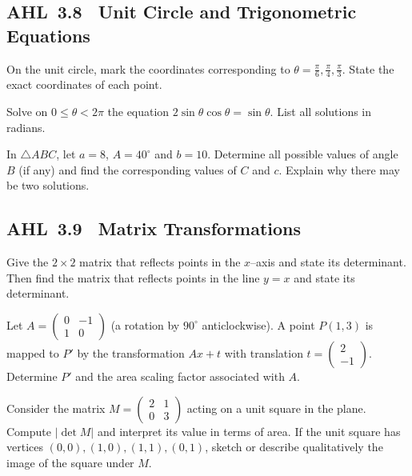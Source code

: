 \documentclass[11pt]{article}
\def\mathbf#1{#1}%
\newcommand{\tocsubsection}[1]{\subsection{#1}}
\newcounter{question}
\begin{document}
\tocsubsection{AHL 3.8 \; Unit Circle and Trigonometric Equations}

\begin{question}
On the unit circle, mark the coordinates corresponding to
\(\theta=\tfrac{\pi}{6},\tfrac{\pi}{4},\tfrac{\pi}{3}\).  State the exact
coordinates of each point.
\end{question}

\begin{question}
Solve on $0\le\theta<2\pi$ the equation $2\sin\theta\cos\theta=\sin\theta$.  List
all solutions in radians.
\end{question}

\begin{question}
In $\triangle ABC$, let $a=8$, $A=40^{\circ}$ and $b=10$.  Determine all
possible values of angle~$B$ (if any) and find the corresponding values of
$C$ and $c$.  Explain why there may be two solutions.
\end{question}

\tocsubsection{AHL 3.9 \; Matrix Transformations}

\begin{question}
Give the $2\times2$ matrix that reflects points in the $x$–axis and state its
determinant.  Then find the matrix that reflects points in the line $y=x$ and
state its determinant.
\end{question}

\begin{question}
Let $A=\begin{pmatrix}0 & -1 \\ 1 & 0\end{pmatrix}$ (a rotation by
$90^{\circ}$ anticlockwise).  A point $P(1,3)$ is mapped to $P'$ by the
transformation $A\mathbf{x}+\mathbf{t}$ with translation
$\mathbf{t}=\begin{pmatrix}2 \\ -1\end{pmatrix}$.  Determine $P'$ and the
area scaling factor associated with $A$.
\end{question}

\begin{question}
Consider the matrix $M=\begin{pmatrix}2 & 1 \\ 0 & 3\end{pmatrix}$ acting on
a unit square in the plane.  Compute $|\det M|$ and interpret its value in
terms of area.  If the unit square has vertices $(0,0),(1,0),(1,1),(0,1)$,
sketch or describe qualitatively the image of the square under $M$.
\end{question}
\end{document}
